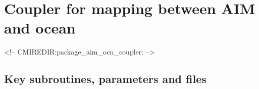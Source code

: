 \section{Coupler for mapping between AIM and ocean }
\label{sec:aim_ocn_coupler}
\label{sec:pkg:aim_ocn_coupler}
\begin{rawhtml}
<!-- CMIREDIR:package_aim_ocn_coupler: -->
\end{rawhtml}

\subsection{Key subroutines, parameters and files}
\label{sec:pkg:aim_ocn_coupler:implementation_synopsis}

